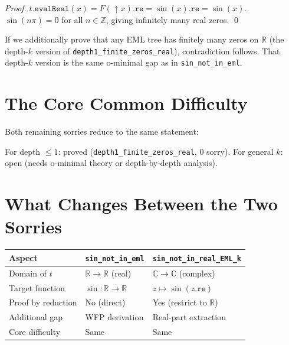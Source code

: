 \documentclass[12pt]{article}
\begin{document}
\begin{proof}
$t.\mathtt{evalReal}(x) = F(\uparrow\!x).\mathtt{re} = \sin(x).\mathtt{re} = \sin(x)$.
$\sin(n\pi) = 0$ for all $n \in \mathbb{Z}$, giving infinitely many real zeros. \qed
\end{proof}

If we additionally prove that any EML tree has finitely many zeros on $\mathbb{R}$
(the depth-$k$ version of \texttt{depth1\_finite\_zeros\_real}), contradiction follows.
That depth-$k$ version is the same o-minimal gap as in \texttt{sin\_not\_in\_eml}.

\section{The Core Common Difficulty}

Both remaining sorries reduce to the same statement:

\begin{center}
\end{center}

For depth $\leq 1$: \textcolor{proved}{proved} (\texttt{depth1\_finite\_zeros\_real}, 0 sorry).
For general $k$: \textcolor{open}{open} (needs o-minimal theory or depth-by-depth analysis).

\section{What Changes Between the Two Sorries}

\begin{center}
\begin{tabular}{lll}
\toprule
Aspect & \texttt{sin\_not\_in\_eml} & \texttt{sin\_not\_in\_real\_EML\_k} \\
\midrule
Domain of $t$ & $\mathbb{R} \to \mathbb{R}$ (real) & $\mathbb{C} \to \mathbb{C}$ (complex) \\
Target function & $\sin : \mathbb{R} \to \mathbb{R}$ & $z \mapsto \sin(z.\mathtt{re})$ \\
Proof by reduction & No (direct) & Yes (restrict to $\mathbb{R}$) \\
Additional gap & WFP derivation & Real-part extraction \\
Core difficulty & Same & Same \\
\bottomrule
\end{tabular}
\end{center}
\end{document}
